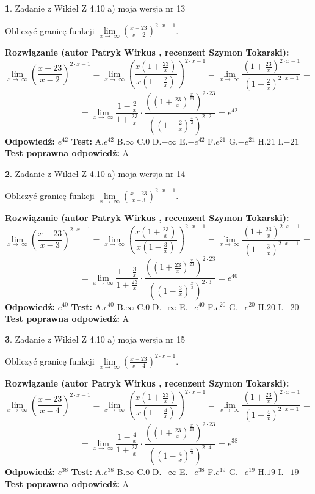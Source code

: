 \documentclass[12pt, a4paper]{article}
\theoremstyle{definition} %
\newtheorem{zad}{}
\newcommand{\zadStart}[1]{\begin{zad}#1\newline}
\newcommand{\zadStop}{\end{zad}}
\newcommand{\rozwStart}[2]{\noindent \textbf{Rozwiązanie (autor #1 , recenzent #2): }\newline}
\newcommand{\rozwStop}{\newline}
\newcommand{\odpStart}{\noindent \textbf{Odpowiedź:}\newline}
\newcommand{\odpStop}{\newline}
\newcommand{\testStart}{\noindent \textbf{Test:}\newline}
\newcommand{\testStop}{\newline}
\newcommand{\kluczStart}{\noindent \textbf{Test poprawna odpowiedź:}\newline}
\newcommand{\kluczStop}{\newline}
\begin{document}
\zadStart{Zadanie z Wikieł Z 4.10 a) moja wersja nr 13}

Obliczyć granicę funkcji  $\lim\limits_{x\to\ \infty}(\frac{x+23}{x-2})^{2\cdot x-1}$.
\zadStop
\rozwStart{Patryk Wirkus}{Szymon Tokarski}
$$\lim\limits_{x\to\ \infty}(\frac{x+23}{x-2})^{2\cdot x-1} = \lim\limits_{x\to\ \infty}(\frac{x(1+\frac{23}{x})}{x(1-\frac{2}{x})})^{2\cdot x-1}=\lim\limits_{x\to\ \infty}\frac{(1+\frac{23}{x})^{2\cdot x-1}}{(1-\frac{2}{x})^{2\cdot x-1}}=$$
$$=\lim\limits_{x\to\ \infty}\frac{1-\frac{2}{x}}{1+\frac{23}{x}}\cdot\frac{((1+\frac{23}{x})^{\frac{x}{23}})^{2\cdot23}}{((1-\frac{2}{x})^{\frac{x}{2}})^{2\cdot2}}=e^{42}$$
\rozwStop
\odpStart
$e^{42}$
\odpStop
\testStart
A.$e^{42}$ B.$\infty$ C.$0$ D.$-\infty$ E.$-e^{42}$
F.$e^{21}$ G.$-e^{21}$
H.$21$
I.$-21$
\testStop
\kluczStart
A
\kluczStop



\zadStart{Zadanie z Wikieł Z 4.10 a) moja wersja nr 14}

Obliczyć granicę funkcji  $\lim\limits_{x\to\ \infty}(\frac{x+23}{x-3})^{2\cdot x-1}$.
\zadStop
\rozwStart{Patryk Wirkus}{Szymon Tokarski}
$$\lim\limits_{x\to\ \infty}(\frac{x+23}{x-3})^{2\cdot x-1} = \lim\limits_{x\to\ \infty}(\frac{x(1+\frac{23}{x})}{x(1-\frac{3}{x})})^{2\cdot x-1}=\lim\limits_{x\to\ \infty}\frac{(1+\frac{23}{x})^{2\cdot x-1}}{(1-\frac{3}{x})^{2\cdot x-1}}=$$
$$=\lim\limits_{x\to\ \infty}\frac{1-\frac{3}{x}}{1+\frac{23}{x}}\cdot\frac{((1+\frac{23}{x})^{\frac{x}{23}})^{2\cdot23}}{((1-\frac{3}{x})^{\frac{x}{3}})^{2\cdot3}}=e^{40}$$
\rozwStop
\odpStart
$e^{40}$
\odpStop
\testStart
A.$e^{40}$ B.$\infty$ C.$0$ D.$-\infty$ E.$-e^{40}$
F.$e^{20}$ G.$-e^{20}$
H.$20$
I.$-20$
\testStop
\kluczStart
A
\kluczStop



\zadStart{Zadanie z Wikieł Z 4.10 a) moja wersja nr 15}

Obliczyć granicę funkcji  $\lim\limits_{x\to\ \infty}(\frac{x+23}{x-4})^{2\cdot x-1}$.
\zadStop
\rozwStart{Patryk Wirkus}{Szymon Tokarski}
$$\lim\limits_{x\to\ \infty}(\frac{x+23}{x-4})^{2\cdot x-1} = \lim\limits_{x\to\ \infty}(\frac{x(1+\frac{23}{x})}{x(1-\frac{4}{x})})^{2\cdot x-1}=\lim\limits_{x\to\ \infty}\frac{(1+\frac{23}{x})^{2\cdot x-1}}{(1-\frac{4}{x})^{2\cdot x-1}}=$$
$$=\lim\limits_{x\to\ \infty}\frac{1-\frac{4}{x}}{1+\frac{23}{x}}\cdot\frac{((1+\frac{23}{x})^{\frac{x}{23}})^{2\cdot23}}{((1-\frac{4}{x})^{\frac{x}{4}})^{2\cdot4}}=e^{38}$$
\rozwStop
\odpStart
$e^{38}$
\odpStop
\testStart
A.$e^{38}$ B.$\infty$ C.$0$ D.$-\infty$ E.$-e^{38}$
F.$e^{19}$ G.$-e^{19}$
H.$19$
I.$-19$
\testStop
\kluczStart
A
\kluczStop
\end{document}
